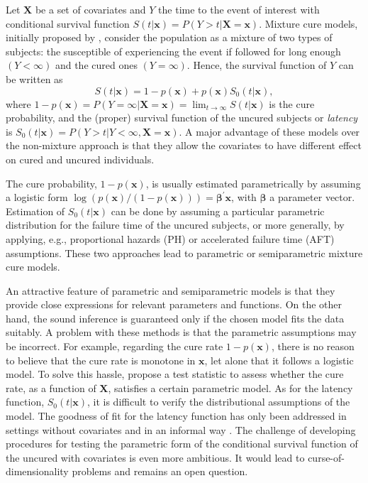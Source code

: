 Let $\mathbf{X}$ be a set of covariates and $Y$ the time to the event of interest with conditional survival function $S\left (t|\mathbf{x}\right )=P\left (Y > t|\mathbf{X}=\mathbf{x} \right)$. Mixture cure models, initially proposed by \citet{Boag}, consider the population as a mixture of two types of subjects: the susceptible of experiencing the event if followed for long enough $\left (Y<\infty \right)$ and the cured ones $\left (Y=\infty \right)$. Hence, the survival function of $Y$ can be written as
\[
S\left (t|\mathbf{x} \right)=1 - p\left (\mathbf{x} \right) + p\left (\mathbf{x} \right) S_0\left (t|\mathbf{x} \right),
\]
where $1-p\left (\mathbf{x} \right)=P\left (Y=\infty | \mathbf{X} = \mathbf{x} \right) = \lim_{t\rightarrow \infty} S\left (t|\mathbf{x} \right)$ is the cure probability, and the (proper) survival function of the uncured subjects or \emph{latency} is $S_0 \left (t|\mathbf{x} \right) = P\left (Y > t|Y<\infty, \mathbf{X}=\mathbf{x} \right)$. A major advantage of these models over the non-mixture approach is that they allow the covariates to have different effect on cured and uncured individuals.

The cure probability, $1-p\left (\mathbf{x} \right)$, is usually estimated parametrically by assuming a logistic form $\log \left (p \left (\mathbf{x} \right )/\left (1-p \left (\mathbf{x}\right ) \right) \right )=\boldsymbol{\beta}^\prime\mathbf{x}$, with $\boldsymbol{\beta}$ a parameter vector. Estimation of $S_0 \left (t|\mathbf{x} \right )$ can be done by assuming a particular parametric distribution for the failure time of the uncured subjects, or more generally, by applying, e.g., proportional hazards (PH) or accelerated failure time (AFT) assumptions. These two approaches lead to parametric \citep[see, e.g.,][]{Farewell1, Farewell2, Denham} or semiparametric \citep[see, e.g.,][]{Kuk, Peng2, Peng1, Li1} mixture cure models.

An attractive feature of parametric and semiparametric models is that they provide close expressions for relevant parameters and functions. On the other hand, the sound inference is guaranteed only if the chosen model fits the data suitably. A problem with these methods is that the parametric assumptions may be incorrect. For example, regarding the cure rate $1-p \left (\mathbf{x} \right)$, there is no reason to believe that the cure rate is monotone in $\mathbf{x}$, let alone that it follows a logistic model. To solve this hassle, \citet{Muller} propose a test statistic to assess whether the cure rate, as a function of $\mathbf{X}$, satisfies a certain parametric model. As for the latency function, $S_0 \left (t|\mathbf{x} \right)$, it is difficult to verify the distributional assumptions of the model. The goodness of fit for the latency function has only been addressed in settings without covariates and in an informal way \citep{Maller2}. The challenge of developing procedures for testing the parametric form of the conditional survival function of the uncured with covariates is even more ambitious. It would lead to curse-of-dimensionality problems and remains an open question.

